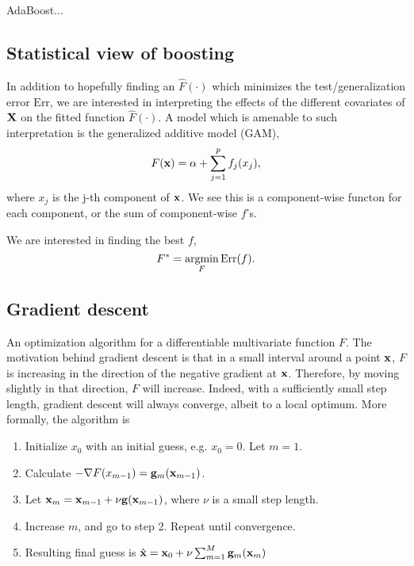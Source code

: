 AdaBoost...

\subsection{Statistical view of boosting}
In addition to hopefully finding an $\hat{F}(\cdot)$ which minimizes the test/generalization error $\text{Err}$, we are interested in interpreting the effects of the different covariates of $\mathbf{X}$ on the fitted function $\hat{F}(\cdot)$. A model which is amenable to such interpretation is the generalized additive model (GAM),
\begin{equation}
    F(\mathbf{x})=\alpha+\sum_{j=1}^pf_j(x_j),
\end{equation}
where $x_j$ is the j-th component of $\mathbf{x}$. We see this is a component-wise functon for each component, or the sum of component-wise $f$'s.

We are interested in finding the best $f$,
\begin{equation}
    F^*=\operatorname*{argmin}_{F}\text{Err}(f).
\end{equation}

\subsection{Gradient descent}
An optimization algorithm for a differentiable multivariate function $F$. The motivation behind gradient descent is that in a small interval around a point $\mathbf{x}$, $F$ is increasing in the direction of the negative gradient at $\mathbf{x}$. Therefore, by moving slightly in that direction, $F$ will increase. Indeed, with a sufficiently small step length, gradient descent will always converge, albeit to a local optimum. More formally, the algorithm is
\begin{enumerate}
    \item Initialize $x_0$ with an initial guess, e.g. $x_0=0$. Let $m=1$.
    \item Calculate $-\nabla F({x_{m-1}})=\mathbf{g}_m(\mathbf{x}_{m-1})$.
    \item Let $\mathbf{x}_m=\mathbf{x}_{m-1}+\nu\mathbf{g}(\mathbf{x}_{m-1})$, where $\nu$ is a small step length.
    \item Increase $m$, and go to step 2. Repeat until convergence.
    \item Resulting final guess is $\hat{\mathbf{x}}=\mathbf{x}_0+\nu\sum_{m=1}^M\mathbf{g}_m(\mathbf{x}_m)$
\end{enumerate}

